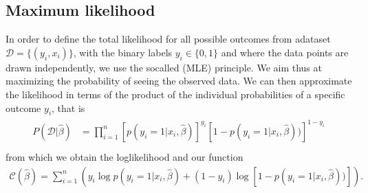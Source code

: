 \documentclass[letterpaper,10pt,english]{sphinxmanual}
\begin{document}
\subsection{Maximum likelihood}
\label{\detokenize{chapter5:maximum-likelihood}}
In order to define the total likelihood for all possible outcomes from adataset \(\mathcal{D}=\{(y_i,x_i)\}\), with the binary labels
\(y_i\in\{0,1\}\) and where the data points are drawn independently, we use the so\sphinxhyphen{}called  (MLE) principle.
We aim thus at maximizing
the probability of seeing the observed data. We can then approximate the
likelihood in terms of the product of the individual probabilities of a specific outcome \(y_i\), that is
\begin{equation*}
\begin{split}
\begin{align*}
P(\mathcal{D}|\hat{\beta})& = \prod_{i=1}^n \left[p(y_i=1|x_i,\hat{\beta})\right]^{y_i}\left[1-p(y_i=1|x_i,\hat{\beta}))\right]^{1-y_i}\nonumber \\
\end{align*}
\end{split}
\end{equation*}
from which we obtain the log\sphinxhyphen{}likelihood and our  function
\begin{equation*}
\begin{split}
\mathcal{C}(\hat{\beta}) = \sum_{i=1}^n \left( y_i\log{p(y_i=1|x_i,\hat{\beta})} + (1-y_i)\log\left[1-p(y_i=1|x_i,\hat{\beta}))\right]\right).
\end{split}
\end{equation*}
\end{document}
